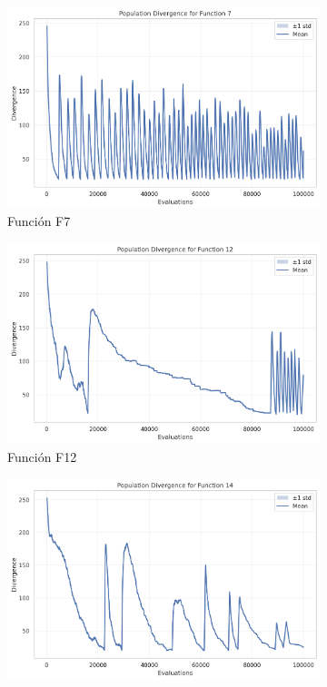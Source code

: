 \documentclass[11pt,a4paper]{article}
\begin{document}
\begin{figure}[h!]
    \centering
    \begin{subfigure}[b]{0.45\textwidth}
        \includegraphics[width=\textwidth]{assets/F7_divergence.png}
        \caption{Función F7}
        \label{fig:f7_div}
    \end{subfigure}
    \hfill
    \begin{subfigure}[b]{0.45\textwidth}
        \includegraphics[width=\textwidth]{assets/F12_divergence.png}
        \caption{Función F12}
        \label{fig:f12_div}
    \end{subfigure}
    \hfill
    \begin{subfigure}[b]{0.45\textwidth}
        \includegraphics[width=\textwidth]{assets/F14_divergence.png}

\end{subfigure}
\end{figure}
\end{document}
